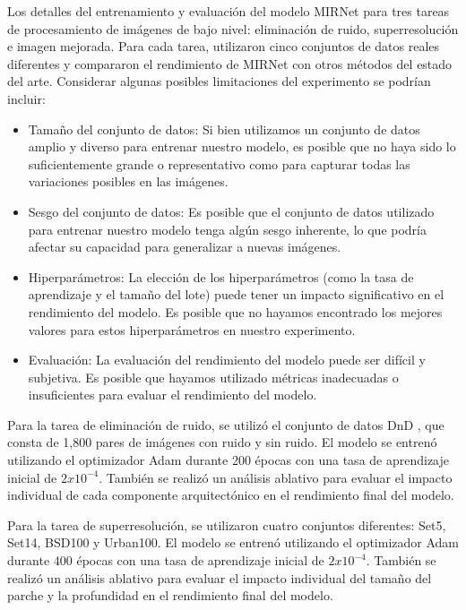 \documentclass[a4paper,
               ]{jacow}
\begin{document}
Los detalles del entrenamiento y evaluación del modelo MIRNet para tres tareas de procesamiento de imágenes de bajo nivel: eliminación de ruido, superresolución e imagen mejorada. Para cada tarea, utilizaron cinco conjuntos de datos reales diferentes y compararon el rendimiento de MIRNet con otros métodos del estado del arte. Considerar algunas posibles limitaciones del experimento se podrían incluir:

\begin{itemize}
  \item Tamaño del conjunto de datos: Si bien utilizamos un conjunto de datos amplio y diverso para entrenar nuestro modelo, es posible que no haya sido lo suficientemente grande o representativo como para capturar todas las variaciones posibles en las imágenes.
  \item Sesgo del conjunto de datos: Es posible que el conjunto de datos utilizado para entrenar nuestro modelo tenga algún sesgo inherente, lo que podría afectar su capacidad para generalizar a nuevas imágenes.
  \item Hiperparámetros: La elección de los hiperparámetros (como la tasa de aprendizaje y el tamaño del lote) puede tener un impacto significativo en el rendimiento del modelo. Es posible que no hayamos encontrado los mejores valores para estos hiperparámetros en nuestro experimento.
  \item Evaluación: La evaluación del rendimiento del modelo puede ser difícil y subjetiva. Es posible que hayamos utilizado métricas inadecuadas o insuficientes para evaluar el rendimiento del modelo.
\end{itemize}

Para la tarea de eliminación de ruido, se utilizó el conjunto de datos DnD \cite{dnd}, que consta de 1,800 pares de imágenes con ruido y sin ruido. El modelo se entrenó utilizando el optimizador Adam durante 200 épocas con una tasa de aprendizaje inicial de $2x10^{-4}$. También se realizó un análisis ablativo para evaluar el impacto individual de cada componente arquitectónico en el rendimiento final del modelo.

Para la tarea de superresolución, se utilizaron cuatro conjuntos diferentes: Set5, Set14, BSD100 y Urban100. El modelo se entrenó utilizando el optimizador Adam durante 400 épocas con una tasa de aprendizaje inicial de $2x10^{-4}$. También se realizó un análisis ablativo para evaluar el impacto individual del tamaño del parche y la profundidad en el rendimiento final del modelo.
\end{document}
